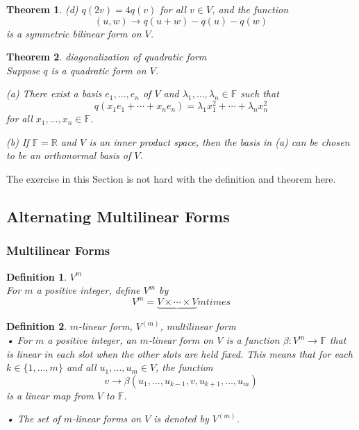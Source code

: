 \documentclass{article}
\newtheorem{theorem}{Theorem}[subsection]
\newtheorem{definition}{Definition}[subsection]
\newcommand{\RR}{\mathbb{R}}
\newcommand{\FF}{\mathbb{F}}
\begin{document}
\begin{CJK}{UTF8}{gkai}
\begin{theorem}
    (d) $q(2v) = 4q(v)$ for all $v \in V$, and the function
    \[(u, w) \to q(u+w)-q(u)-q(w)\]
    is a symmetric bilinear form on $V$.
\end{theorem}   

\begin{theorem}
    diagonalization of quadratic form\\
    
    Suppose $q$ is a quadratic form on $V$.

    (a) There exist a basis $e_1,\ldots,e_n$ of $V$ and $\lambda_1,\ldots, \lambda_n \in \FF$ such that
    \[q(x_1e_1 + \cdots +x_ne_n) = \lambda_1x_1^2 +\cdots+ \lambda_n x_n^2\]
    for all $x_1,\ldots,x_n \in \FF$.

    (b) If $\FF = \RR$ and $V$ is an inner product space, then the basis in (a) can be chosen to be an orthonormal basis of $V$.
\end{theorem}

The exercise in this Section is not hard with the definition and theorem here.\\

\subsection{Alternating Multilinear Forms}

\subsubsection{Multilinear Forms}

\begin{definition}
    $V^m$\\
    For $m$ a positive integer, define $V^m$ by
    \[V^m =\underbrace{V\times \cdots\times V} m times\]
\end{definition}

\begin{definition}
    $m$-linear form, $V^{(m)}$, multilinear form\\

    • For $m$ a positive integer, an $m$-linear form on $V$ is a function $\beta: V^m \to \FF$ that is linear in each slot when the other slots are held fixed. This means that for each $k \in \{1,\ldots,m\}$ and all $u_1,\ldots,u_m \in V$, the function 
    \[v \to\beta(u_1,\ldots,u_{k-1},v,u_{k+1},\ldots,u_m)\]
    is a linear map from $V$ to $\FF$.

    • The set of $m$-linear forms on $V$ is denoted by $V^{(m)}$.


\end{definition}
\end{CJK}
\end{document}
